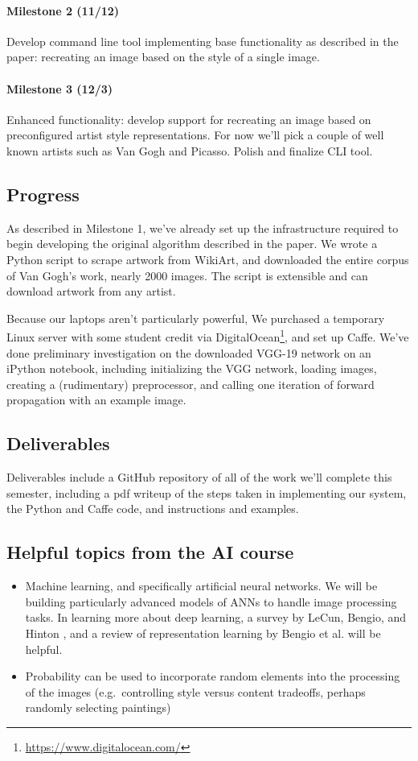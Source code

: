 \documentclass[letterpaper,10pt]{article}
\begin{document}
\paragraph{Milestone 2 (11/12)} Develop command line tool implementing base
functionality as described in the paper: recreating an image based
on the style of a single image.
\paragraph{Milestone 3 (12/3)} Enhanced functionality: develop support for
recreating an image based on preconfigured artist style representations. For
now we'll pick a couple of well known artists such as Van Gogh and Picasso.
Polish and finalize CLI tool.

\subsection*{Progress}
As described in Milestone 1, we've already set up the infrastructure required
to begin developing the original algorithm described in the paper. We wrote a
Python script to scrape artwork from WikiArt, and downloaded the entire corpus
of Van Gogh's work, nearly 2000 images. The script is extensible and can
download artwork from any artist.

Because our
laptops aren't particularly powerful, We purchased a temporary Linux server with
some student credit via DigitalOcean\footnote{\href{https://www.digitalocean.com/}{https://www.digitalocean.com/}}, and set up Caffe. We've done preliminary
investigation on the downloaded VGG-19 network on an iPython notebook,
including initializing the VGG network, loading images, creating a
(rudimentary) preprocessor, and calling one iteration of forward propagation
with an example image.

\subsection*{Deliverables}
Deliverables include a GitHub repository of all of the work we'll complete this
semester, including a pdf writeup of the steps taken in implementing our
system, the Python and Caffe code, and instructions and examples.

\subsection*{Helpful topics from the AI course}

\begin{itemize}
    \item Machine learning, and specifically artificial neural networks. We will be
    building particularly advanced models of ANNs to handle image processing
    tasks. In learning more about deep learning, a survey by LeCun, Bengio, and
    Hinton \cite{lecun2015}, and a review of representation learning by Bengio
    et al. \cite{bengio2012} will be helpful.
    \item Probability can be used to incorporate random elements into the
      processing of the images (e.g.\ controlling style versus content
      tradeoffs, perhaps randomly selecting paintings)
\end{itemize}
\end{document}
